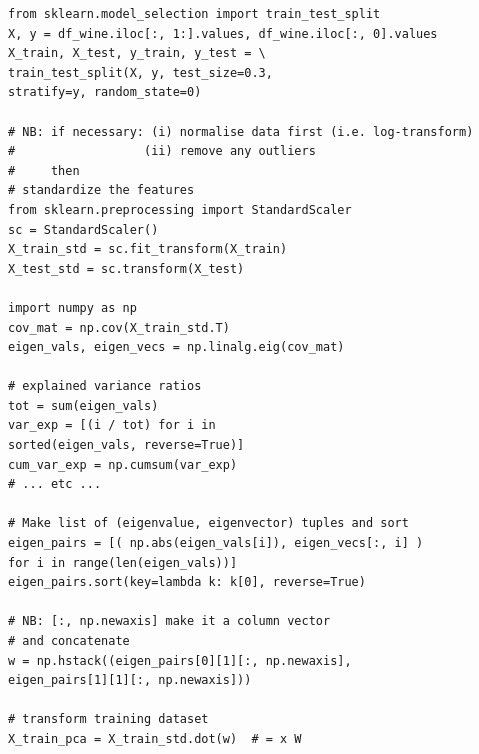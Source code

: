 \documentclass[11pt]{article}
\begin{document}
\begin{lstlisting}
from sklearn.model_selection import train_test_split
X, y = df_wine.iloc[:, 1:].values, df_wine.iloc[:, 0].values
X_train, X_test, y_train, y_test = \
train_test_split(X, y, test_size=0.3, 
stratify=y, random_state=0)

# NB: if necessary: (i) normalise data first (i.e. log-transform)
#                  (ii) remove any outliers 
#     then		
# standardize the features
from sklearn.preprocessing import StandardScaler
sc = StandardScaler()
X_train_std = sc.fit_transform(X_train)
X_test_std = sc.transform(X_test)

import numpy as np
cov_mat = np.cov(X_train_std.T)
eigen_vals, eigen_vecs = np.linalg.eig(cov_mat)

# explained variance ratios
tot = sum(eigen_vals)
var_exp = [(i / tot) for i in
sorted(eigen_vals, reverse=True)]
cum_var_exp = np.cumsum(var_exp)
# ... etc ... 

# Make list of (eigenvalue, eigenvector) tuples and sort
eigen_pairs = [( np.abs(eigen_vals[i]), eigen_vecs[:, i] )
for i in range(len(eigen_vals))]
eigen_pairs.sort(key=lambda k: k[0], reverse=True)

# NB: [:, np.newaxis] make it a column vector
# and concatenate 
w = np.hstack((eigen_pairs[0][1][:, np.newaxis],
eigen_pairs[1][1][:, np.newaxis]))

# transform training dataset
X_train_pca = X_train_std.dot(w)  # = x W

\end{lstlisting}
\end{document}
